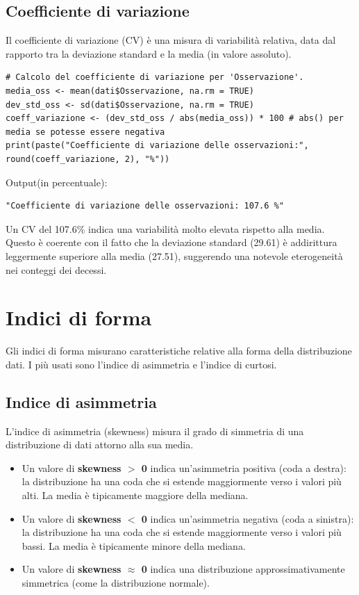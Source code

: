 \documentclass[14pt, openany, titlepage]{report} %
\begin{document}
\section{Coefficiente di variazione}
Il coefficiente di variazione (CV) è una misura di variabilità relativa,
 data dal rapporto tra la deviazione standard e la media (in valore assoluto).
\begin{center}
\begin{lstlisting}[breaklines=true]
# Calcolo del coefficiente di variazione per 'Osservazione'.
media_oss <- mean(dati$Osservazione, na.rm = TRUE)
dev_std_oss <- sd(dati$Osservazione, na.rm = TRUE)
coeff_variazione <- (dev_std_oss / abs(media_oss)) * 100 # abs() per media se potesse essere negativa
print(paste("Coefficiente di variazione delle osservazioni:", round(coeff_variazione, 2), "%"))
\end{lstlisting}
\end{center}
\noindent
Output(in percentuale):
\begin{verbatim}
"Coefficiente di variazione delle osservazioni: 107.6 %"
\end{verbatim}
Un CV del 107.6\% indica una variabilità molto elevata rispetto alla 
media. Questo è coerente con il fatto che la deviazione standard (29.61)
 è addirittura leggermente superiore alla media (27.51), suggerendo una
  notevole eterogeneità nei conteggi dei decessi.
\FloatBarrier


\chapter{Indici di forma}
Gli indici di forma misurano caratteristiche relative alla forma della distribuzione
dati. I più usati sono l'indice di asimmetria e l'indice di curtosi.

\section{Indice di asimmetria}
L'indice di asimmetria (skewness) misura il grado di simmetria di
 una distribuzione di dati attorno alla sua media.
\begin{itemize}
    \item Un valore di \textbf{skewness $>$ 0} indica un'asimmetria positiva (coda a destra): la distribuzione ha una coda che si estende maggiormente verso i valori più alti. La media è tipicamente maggiore della mediana.
    \item Un valore di \textbf{skewness $<$ 0} indica un'asimmetria negativa (coda a sinistra): la distribuzione ha una coda che si estende maggiormente verso i valori più bassi. La media è tipicamente minore della mediana.
    \item Un valore di \textbf{skewness $\approx$ 0} indica una distribuzione approssimativamente simmetrica (come la distribuzione normale).
\end{itemize}
\end{document}
